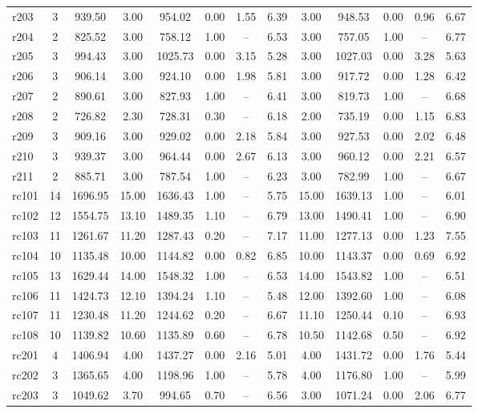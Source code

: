 \begin{longtable}{lcccccccccccc}
r203 & 3 & 939.50 & 3.00 & 954.02 & 0.00 & 1.55 & 6.39 & 3.00 & 948.53 & 0.00 & 0.96 & 6.67 \\
r204 & 2 & 825.52 & 3.00 & 758.12 & 1.00 & -- & 6.53 & 3.00 & 757.05 & 1.00 & -- & 6.77 \\
r205 & 3 & 994.43 & 3.00 & 1025.73 & 0.00 & 3.15 & 5.28 & 3.00 & 1027.03 & 0.00 & 3.28 & 5.63 \\
r206 & 3 & 906.14 & 3.00 & 924.10 & 0.00 & 1.98 & 5.81 & 3.00 & 917.72 & 0.00 & 1.28 & 6.42 \\
r207 & 2 & 890.61 & 3.00 & 827.93 & 1.00 & -- & 6.41 & 3.00 & 819.73 & 1.00 & -- & 6.68 \\
r208 & 2 & 726.82 & 2.30 & 728.31 & 0.30 & -- & 6.18 & 2.00 & 735.19 & 0.00 & 1.15 & 6.83 \\
r209 & 3 & 909.16 & 3.00 & 929.02 & 0.00 & 2.18 & 5.84 & 3.00 & 927.53 & 0.00 & 2.02 & 6.48 \\
r210 & 3 & 939.37 & 3.00 & 964.44 & 0.00 & 2.67 & 6.13 & 3.00 & 960.12 & 0.00 & 2.21 & 6.57 \\
r211 & 2 & 885.71 & 3.00 & 787.54 & 1.00 & -- & 6.23 & 3.00 & 782.99 & 1.00 & -- & 6.67 \\
rc101 & 14 & 1696.95 & 15.00 & 1636.43 & 1.00 & -- & 5.75 & 15.00 & 1639.13 & 1.00 & -- & 6.01 \\
rc102 & 12 & 1554.75 & 13.10 & 1489.35 & 1.10 & -- & 6.79 & 13.00 & 1490.41 & 1.00 & -- & 6.90 \\
rc103 & 11 & 1261.67 & 11.20 & 1287.43 & 0.20 & -- & 7.17 & 11.00 & 1277.13 & 0.00 & 1.23 & 7.55 \\
rc104 & 10 & 1135.48 & 10.00 & 1144.82 & 0.00 & 0.82 & 6.85 & 10.00 & 1143.37 & 0.00 & 0.69 & 6.92 \\
rc105 & 13 & 1629.44 & 14.00 & 1548.32 & 1.00 & -- & 6.53 & 14.00 & 1543.82 & 1.00 & -- & 6.51 \\
rc106 & 11 & 1424.73 & 12.10 & 1394.24 & 1.10 & -- & 5.48 & 12.00 & 1392.60 & 1.00 & -- & 6.08 \\
rc107 & 11 & 1230.48 & 11.20 & 1244.62 & 0.20 & -- & 6.67 & 11.10 & 1250.44 & 0.10 & -- & 6.93 \\
rc108 & 10 & 1139.82 & 10.60 & 1135.89 & 0.60 & -- & 6.78 & 10.50 & 1142.68 & 0.50 & -- & 6.92 \\
rc201 & 4 & 1406.94 & 4.00 & 1437.27 & 0.00 & 2.16 & 5.01 & 4.00 & 1431.72 & 0.00 & 1.76 & 5.44 \\
rc202 & 3 & 1365.65 & 4.00 & 1198.96 & 1.00 & -- & 5.78 & 4.00 & 1176.80 & 1.00 & -- & 5.99 \\
rc203 & 3 & 1049.62 & 3.70 & 994.65 & 0.70 & -- & 6.56 & 3.00 & 1071.24 & 0.00 & 2.06 & 6.77 \\

\end{longtable}
